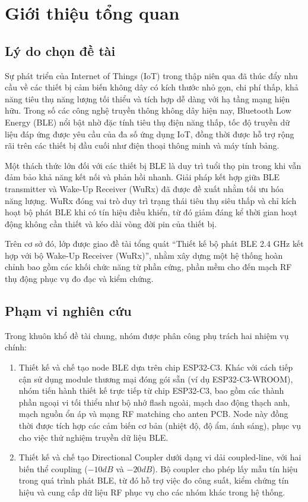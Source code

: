 \fontsize{13}{14}\selectfont
\section{Giới thiệu tổng quan}
\subsection{Lý do chọn đề tài}

Sự phát triển của Internet of Things (IoT) trong thập niên qua đã thúc đẩy nhu cầu về các thiết bị cảm biến không dây có kích thước nhỏ gọn, chi phí thấp, khả năng tiêu thụ năng lượng tối thiểu và tích hợp dễ dàng với hạ tầng mạng hiện hữu. Trong số các công nghệ truyền thông không dây hiện nay, Bluetooth Low Energy (BLE) nổi bật nhờ đặc tính tiêu thụ điện năng thấp, tốc độ truyền dữ liệu đáp ứng được yêu cầu của đa số ứng dụng IoT, đồng thời được hỗ trợ rộng rãi trên các thiết bị đầu cuối như điện thoại thông minh và máy tính bảng.

Một thách thức lớn đối với các thiết bị BLE là duy trì tuổi thọ pin trong khi vẫn đảm bảo khả năng kết nối và phản hồi nhanh. Giải pháp kết hợp giữa BLE transmitter và Wake-Up Receiver (WuRx) đã được đề xuất nhằm tối ưu hóa năng lượng. WuRx đóng vai trò duy trì trạng thái tiêu thụ siêu thấp và chỉ kích hoạt bộ phát BLE khi có tín hiệu điều khiển, từ đó giảm đáng kể thời gian hoạt động không cần thiết và kéo dài vòng đời pin của thiết bị.

Trên cơ sở đó, lớp được giao đề tài tổng quát “Thiết kế bộ phát BLE 2.4 GHz kết hợp với bộ Wake-Up Receiver (WuRx)”, nhằm xây dựng một hệ thống hoàn chỉnh bao gồm các khối chức năng từ phần cứng, phần mềm cho đến mạch RF thụ động phục vụ đo đạc và kiểm chứng.
\subsection{Phạm vi nghiên cứu}
Trong khuôn khổ đề tài chung, nhóm được phân công phụ trách hai nhiệm vụ chính:

\begin{enumerate}[label=\arabic*)]
	\item Thiết kế và chế tạo node BLE dựa trên chip ESP32-C3. Khác với cách tiếp cận sử dụng module thương mại đóng gói sẵn (ví dụ ESP32-C3-WROOM), nhóm tiến hành thiết kế trực tiếp từ chip ESP32-C3, bao gồm các thành phần ngoại vi tối thiểu như bộ nhớ flash ngoài, mạch dao động thạch anh, mạch nguồn ổn áp và mạng RF matching cho anten PCB. Node này đồng thời được tích hợp các cảm biến cơ bản (nhiệt độ, độ ẩm, ánh sáng), phục vụ cho việc thử nghiệm truyền dữ liệu BLE.
	\item Thiết kế và chế tạo Directional Coupler dưới dạng vi dải coupled-line, với hai biến thể coupling ($-10dB$ và $-20dB$). Bộ coupler cho phép lấy mẫu tín hiệu trong quá trình phát BLE, từ đó hỗ trợ việc đo công suất, kiểm chứng tín hiệu và cung cấp dữ liệu RF phục vụ cho các nhóm khác trong hệ thống.
\end{enumerate}

